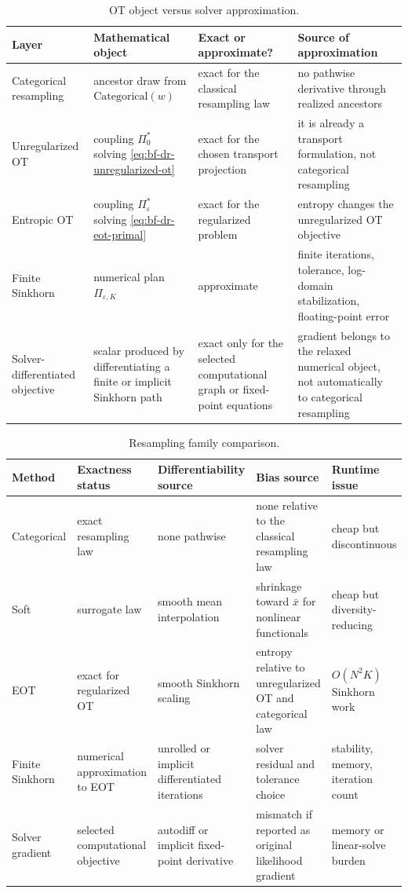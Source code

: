 \begin{table}[ht]
\centering
\small
\begin{tabular}{p{} p{} p{} p{}}
\toprule
Layer & Mathematical object & Exact or approximate? & Source of approximation \\
\midrule
Categorical resampling & ancestor draw from $\mathrm{Categorical}(w)$ & exact for the classical resampling law & no pathwise derivative through realized ancestors \\
Unregularized OT & coupling $\Pi_0^*$ solving \eqref{eq:bf-dr-unregularized-ot} & exact for the chosen transport projection & it is already a transport formulation, not categorical resampling \\
Entropic OT & coupling $\Pi_\varepsilon^*$ solving \eqref{eq:bf-dr-eot-primal} & exact for the regularized problem & entropy changes the unregularized OT objective \\
Finite Sinkhorn & numerical plan $\Pi_{\varepsilon,K}$ & approximate & finite iterations, tolerance, log-domain stabilization, floating-point error \\
Solver-differentiated objective & scalar produced by differentiating a finite or implicit Sinkhorn path & exact only for the selected computational graph or fixed-point equations & gradient belongs to the relaxed numerical object, not automatically to categorical resampling \\
\bottomrule
\end{tabular}
\caption{OT object versus solver approximation.}
\label{tab:bf-dr-ot-object-solver}
\end{table}

\begin{table}[ht]
\centering
\small
\begin{tabular}{p{} p{} p{} p{} p{}}
\toprule
Method & Exactness status & Differentiability source & Bias source & Runtime issue \\
\midrule
Categorical & exact resampling law & none pathwise & none relative to the classical resampling law & cheap but discontinuous \\
Soft & surrogate law & smooth mean interpolation & shrinkage toward $\bar x$ for nonlinear functionals & cheap but diversity-reducing \\
EOT & exact for regularized OT & smooth Sinkhorn scaling & entropy relative to unregularized OT and categorical law & $O(N^2K)$ Sinkhorn work \\
Finite Sinkhorn & numerical approximation to EOT & unrolled or implicit differentiated iterations & solver residual and tolerance choice & stability, memory, iteration count \\
Solver gradient & selected computational objective & autodiff or implicit fixed-point derivative & mismatch if reported as original likelihood gradient & memory or linear-solve burden \\
\bottomrule
\end{tabular}
\caption{Resampling family comparison.}
\label{tab:bf-dr-family-comparison}
\end{table}

